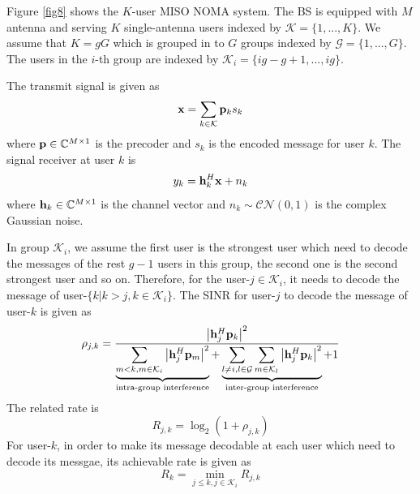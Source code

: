 \documentclass[10pt,conference]{IEEEtran}
\begin{document}
Figure \ref{fig8} shows the $K$-user MISO NOMA system. The BS is equipped with 
$M$ antenna and serving $K$ single-antenna users indexed by $\mathcal{K} = \{1,...,K\}$.
We assume that $K=gG$ which is grouped in to $G$ groups indexed by $\mathcal{G}=\{1,...,G\}$. 
The users in the $i$-th group are indexed by $\mathcal{K}_i = \{ig-g+1,...,ig\}$.

The transmit signal is given as
\begin{equation}
    {\bf{x}} = \sum_{k \in \mathcal{K}} {\bf{p}}_k s_k \label{eq37}
\end{equation}
where ${\bf{p}} \in \mathbb{C}^{M \times 1}$ is the precoder and $s_k$ is the encoded 
message for user $k$.
The signal receiver at user $k$ is 
\begin{equation}
    y_k = {\bf{h}}_k^H {\bf{x}} + n_k \label{eq38}
\end{equation}
where ${\bf{h}}_k \in \mathbb{C}^{M \times 1}$ is the channel vector and 
$n_k \sim \mathcal{CN}(0,1)$ is the complex Gaussian noise.

In group $\mathcal{K}_i$, we assume the first user is the strongest user which need to decode
the messages of the rest $g-1$ users in this group, the second one is the second strongest
user and so on. Therefore, for the user-$j \in \mathcal{K}_i$, it needs to decode the 
message of user-$\{ k | k>j, k \in \mathcal{K}_i \}$. The SINR for user-$j$ to decode
the message of user-$k$ is given as
\begin{equation}
    \rho_{j,k} = \frac{ \left| {\bf{h}}_j^H {\bf{p}}_k \right|^2 }{\underbrace{\sum_{m<k, m \in \mathcal{K}_i} \left| {\bf{h}}_j^H {\bf{p}}_m \right|^2}_{\text{intra-group interference}} + \underbrace{\sum_{l \neq i, l \in \mathcal{G}} \sum_{m \in \mathcal{K}_l} \left| {\bf{h}}_j^H {\bf{p}}_k \right|^2}_{\text{inter-group interference}} + 1}
    \label{eq39}
\end{equation}
The related rate is 
\begin{equation}
    R_{j,k} = \log_2(1 + \rho_{j,k}) \label{eq40}
\end{equation}
For user-$k$, in order to make its message decodable at each user which need to decode its messgae, 
its achievable rate is given as 
\begin{equation}
    R_k = \min_{j \leq k, j \in \mathcal{K}_i} R_{j,k} \label{eq41}
\end{equation}
\end{document}
